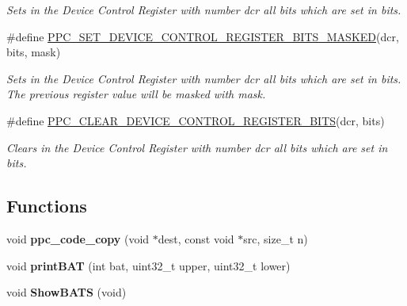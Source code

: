 \begin{DoxyCompactItemize}
\begin{DoxyCompactList}\small\item\em Sets in the Device Control Register with number {\itshape dcr} all bits which are set in {\itshape bits}. \end{DoxyCompactList}\item 
\#define \mbox{\hyperlink{group__RTEMSBSPsPowerPCSharedUtility_ga8fb9b2c1dc025622892b8c9532e11315}{P\+P\+C\+\_\+\+S\+E\+T\+\_\+\+D\+E\+V\+I\+C\+E\+\_\+\+C\+O\+N\+T\+R\+O\+L\+\_\+\+R\+E\+G\+I\+S\+T\+E\+R\+\_\+\+B\+I\+T\+S\+\_\+\+M\+A\+S\+K\+ED}}(dcr,  bits,  mask)
\begin{DoxyCompactList}\small\item\em Sets in the Device Control Register with number {\itshape dcr} all bits which are set in {\itshape bits}. The previous register value will be masked with {\itshape mask}. \end{DoxyCompactList}\item 
\#define \mbox{\hyperlink{group__RTEMSBSPsPowerPCSharedUtility_ga086c9a32db91fc63f36fa127e3bd2c48}{P\+P\+C\+\_\+\+C\+L\+E\+A\+R\+\_\+\+D\+E\+V\+I\+C\+E\+\_\+\+C\+O\+N\+T\+R\+O\+L\+\_\+\+R\+E\+G\+I\+S\+T\+E\+R\+\_\+\+B\+I\+TS}}(dcr,  bits)
\begin{DoxyCompactList}\small\item\em Clears in the Device Control Register with number {\itshape dcr} all bits which are set in {\itshape bits}. \end{DoxyCompactList}\end{DoxyCompactItemize}
\subsection*{Functions}
\begin{DoxyCompactItemize}
\item 
\mbox{\label{group__RTEMSBSPsPowerPCSharedUtility_ga2e14393cbb4fc737bc999816febc8228}} 
void {\bfseries ppc\+\_\+code\+\_\+copy} (void $\ast$dest, const void $\ast$src, size\+\_\+t n)
\item 
\mbox{\label{group__RTEMSBSPsPowerPCSharedUtility_ga4ee607d4a4b9a946dda2ef53c8b158d8}} 
void {\bfseries print\+B\+AT} (int bat, uint32\+\_\+t upper, uint32\+\_\+t lower)
\item 
\mbox{\label{group__RTEMSBSPsPowerPCSharedUtility_ga19e46b6243047334a5f67ccd71b58989}} 
void {\bfseries Show\+B\+A\+TS} (void)
\end{DoxyCompactItemize}
